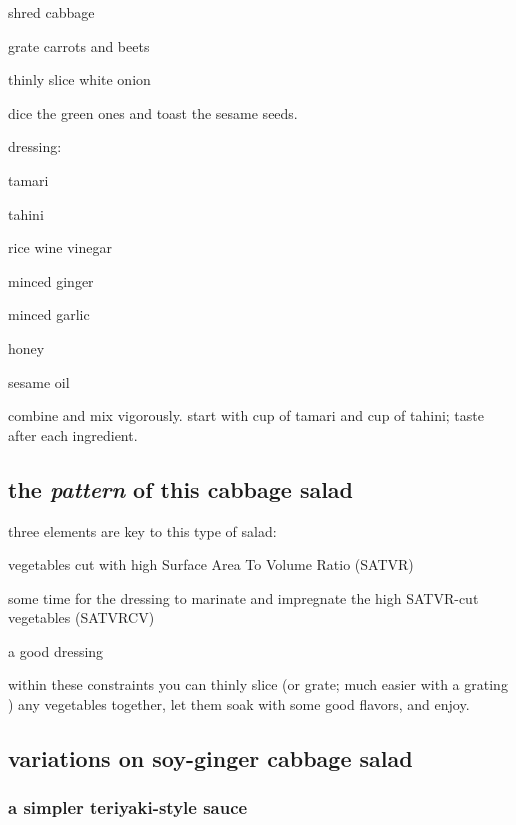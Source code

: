 \begin{ingredients}
  \item shred cabbage
  \item grate carrots and beets
  \item thinly slice white onion
  \item dice the green ones and toast the sesame seeds.
\end{ingredients}
	
dressing:
\begin{ingredients}
  \item tamari
  \item tahini
  \item rice wine vinegar
  \item minced ginger
  \item minced garlic
  \item honey
  \item sesame oil
\end{ingredients}

combine and mix vigorously. start with \onethird cup of tamari and \onequarter 
cup of tahini; taste after each ingredient.

\subsection{the \textit{pattern} of this cabbage salad}

three elements are key to this type of salad:

\begin{ingredients}
  \item vegetables cut with high Surface Area To Volume Ratio (SATVR)
  \item some time for the dressing to marinate and impregnate the high 
  SATVR-cut vegetables (SATVRCV)
  \item a good dressing
\end{ingredients}

within these constraints you can thinly slice (or grate; much easier with a 
grating ) any vegetables together, let them soak with some good flavors, 
and enjoy.

\subsection{variations on soy-ginger cabbage salad}

\subsubsection{a simpler teriyaki-style sauce}

